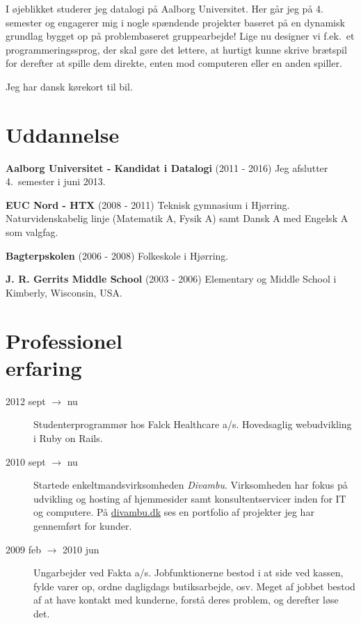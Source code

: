 \documentclass[margin,line,a4paper]{resume}
\begin{document}
\begin{resume}
    I øjeblikket studerer jeg datalogi på Aalborg Universitet. Her går
    jeg på 4. semester og engagerer mig i nogle spændende projekter
    baseret på en dynamisk grundlag bygget op på problembaseret
    gruppearbejde! Lige nu designer vi f.ek.\ et programmeringssprog,
    der skal gøre det lettere, at hurtigt kunne skrive brætspil for
    derefter at spille dem direkte, enten mod computeren eller en anden
    spiller.

    Jeg har dansk kørekort til bil.

    \section{\mysidestyle Uddannelse} \textbf{Aalborg Universitet - Kandidat i Datalogi}
    (2011 - 2016) Jeg afslutter 4.\ semester i juni 2013.

    \textbf{EUC Nord - HTX} (2008 - 2011) Teknisk gymnasium i Hjørring. Naturvidenskabelig
    linje (Matematik A, Fysik A) samt Dansk A med Engelsk A som valgfag.

    \textbf{Bagterpskolen} (2006 - 2008) Folkeskole i Hjørring.

    \textbf{J. R. Gerrits Middle School}
    (2003 - 2006) Elementary og Middle School i Kimberly,
    Wisconsin, USA.

\section{\mysidestyle Professionel\\erfaring}\vspace{1mm}
\begin{description}

  \item[2012 sept $\rightarrow$ nu] Studenterprogrammør hos Falck
Healthcare a/s. Hovedsaglig webudvikling i Ruby on Rails.


  \item[2010 sept $\rightarrow$ nu] Startede enkeltmandsvirksomheden
    \emph{Divambu}. Virksomheden har fokus på udvikling og hosting af
    hjemmesider samt konsultentservicer inden for IT og computere. På
    \url{divambu.dk} ses en portfolio af projekter jeg har gennemført
    for kunder.

  \item[2009 feb $\rightarrow$ 2010 jun] Ungarbejder ved Fakta
    a/s. Jobfunktionerne bestod i at side ved kassen, fylde varer op,
    ordne dagligdags butiksarbejde, osv. Meget af jobbet bestod af at have
    kontakt med kunderne, forstå deres problem, og derefter løse det.


\end{description}
\end{resume}
\end{document}
